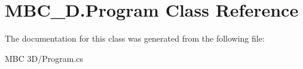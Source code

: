 \hypertarget{class_m_b_c__3_d_1_1_program}{\section{M\-B\-C\-\_\-D.\-Program Class Reference}
\label{class_m_b_c__3_d_1_1_program}
}


The documentation for this class was generated from the following file\-:\begin{DoxyCompactItemize}
\item 
M\-B\-C 3\-D/Program.\-cs\end{DoxyCompactItemize}
